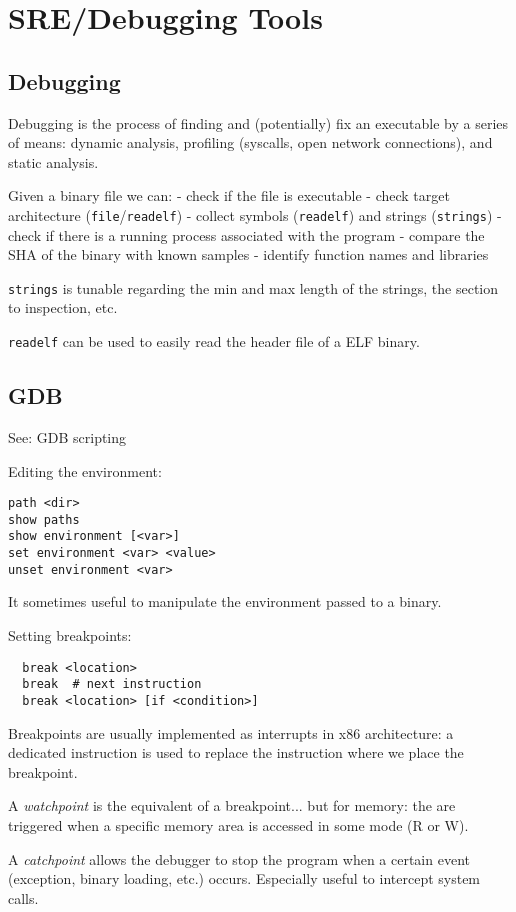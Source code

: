 \chapter{SRE/Debugging Tools}

\section{Debugging}
Debugging is the process of finding and (potentially) fix an executable by a series of means: dynamic analysis, profiling (syscalls, open network connections), and static analysis.

Given a binary file we can:
 - check if the file is executable
 - check target architecture (\texttt{file}/\texttt{readelf})
 - collect symbols (\texttt{readelf}) and strings (\texttt{strings})
 - check if there is a running process associated with the program
 - compare the SHA of the binary with known samples
 - identify function names and libraries

\texttt{strings} is tunable regarding the min and max length of the strings, the section to inspection, etc.

\texttt{readelf} can be used to easily read the header file of a ELF binary. 

\section{GDB}
See: GDB scripting

Editing the environment:
\begin{verbatim}
path <dir>
show paths
show environment [<var>]
set environment <var> <value>
unset environment <var>
\end{verbatim}

It sometimes useful to manipulate the environment passed to a binary.

Setting breakpoints:
\begin{verbatim}
  break <location>
  break  # next instruction
  break <location> [if <condition>]
\end{verbatim}

Breakpoints are usually implemented as interrupts in x86 architecture: a dedicated instruction is used to replace the instruction where we place the breakpoint.

A \textit{watchpoint} is the equivalent of a breakpoint... but for memory: the are triggered when a specific memory area is accessed in some mode (R or W).

A \textit{catchpoint} allows the debugger to stop the program when a certain event (exception, binary loading, etc.) occurs.
Especially useful to intercept system calls.

